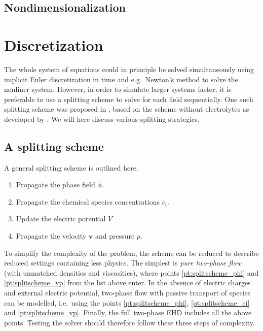 \documentclass[preprint,pre,superscriptaddress,a4paper]{revtex4-1}
\renewcommand{\v}[1]{\ensuremath{\mathbf{#1}}} %
\begin{document}
\subsection{Nondimensionalization}

\section{Discretization}
The whole system of equations could in principle be solved simultaneously using implicit Euler discretization in time and e.g.~Newton's method to solve the nonliner system.
However, in order to simulate larger systems faster, it is preferable to use a splitting scheme to solve for each field sequentially.
One such splitting scheme was proposed in \cite{metzger2015}, based on the scheme without electrolytes as developed by \cite{guillen-gonzalez2014,grun2016}.
We will here discuss various splitting strategies.

\subsection{A splitting scheme}
A general splitting scheme is outlined here.
\begin{enumerate}
\item Propagate the phase field $\phi$. \label{pt:splitscheme_phi}
\item Propagate the chemical species concentrations $c_i$. \label{pt:splitscheme_ci}
\item Update the electric potential $V$ \label{pt:splitscheme_V}
\item Propagate the velocity $\v v$ and pressure $p$. \label{pt:splitscheme_vp}
\end{enumerate}
To simplify the complexity of the problem, the scheme can be reduced to describe reduced settings containing less physics.
The simplest is \emph{pure two-phase flow} (with unmatched densities and viscosities), where points \ref{pt:splitscheme_phi} and \ref{pt:splitscheme_vp} from the list above enter.
In the absence of electric charges and external electric potential, two-phase flow with passive transport of species can be modelled, i.e.~using the points \ref{pt:splitscheme_phi}, \ref{pt:splitscheme_ci} and \ref{pt:splitscheme_vp}.
Finally, the full two-phase EHD includes all the above points.
Testing the solver should therefore follow these three steps of complexity.



\end{document}
